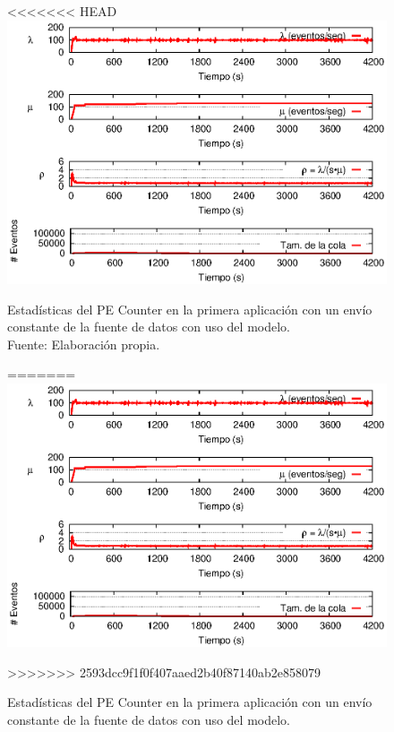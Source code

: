 \begin{figure}[!ht]
<<<<<<< HEAD
    \centering
    \captionsetup{justification=centering}
    \includegraphics[scale=1]{images/exp/app1/uniform/cm/statusCounterPE.eps}
    \caption[Estadísticas del PE Counter en la primera aplicación con un envío constante de la fuente de datos con uso del modelo.]{Estadísticas del PE Counter en la primera aplicación con un envío constante de la fuente de datos con uso del modelo.\\Fuente: Elaboración propia.}
=======
\centering
    \includegraphics[scale=1.1]{images/exp/app1/uniform/cm/statusCounterPE.eps}
    \caption{Estad\'isticas del PE Counter en la primera aplicaci\'on con un env\'io constante de la fuente de datos con uso del modelo.}
>>>>>>> 2593dcc9f1f0f407aaed2b40f87140ab2e858079
    \label{fig:app1-uniform-statusCounterPE-cm}
\end{figure}

